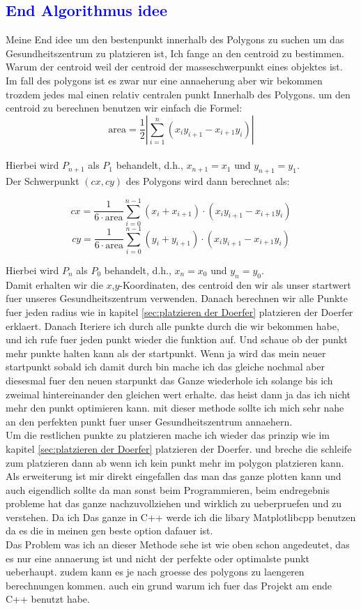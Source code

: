 \documentclass{article}
\begin{document}
\subsection{\textcolor{blue}{End Algorithmus idee}}\label{sec:End}
Meine End idee um den bestenpunkt innerhalb des Polygons zu suchen um das Gesundheitszentrum zu platzieren ist, Ich fange an den centroid zu bestimmen. Warum der centroid weil der centroid der masseschwerpunkt eines objektes ist. Im fall des polygons ist es zwar nur eine annaeherung aber wir bekommen trozdem jedes mal einen relativ centralen punkt Innerhalb des Polygons. um den centroid zu berechnen benutzen wir einfach die Formel:
\[
\text{area} = \frac{1}{2} \left| \sum_{i=1}^{n} (x_i y_{i+1} - x_{i+1} y_i) \right|
\]
\\
Hierbei wird $P_{n+1}$ als $P_1$ behandelt, d.h., $x_{n+1} = x_1$ und $y_{n+1} = y_1$.
\\
Der Schwerpunkt $(cx, cy)$ des Polygons wird dann berechnet als:

\[
cx = \frac{1}{6 \cdot \text{area}} \sum_{i=0}^{n-1} (x_i + x_{i+1}) \cdot (x_i y_{i+1} - x_{i+1} y_i)
\]
\[
cy = \frac{1}{6 \cdot \text{area}} \sum_{i=0}^{n-1} (y_i + y_{i+1}) \cdot (x_i y_{i+1} - x_{i+1} y_i)
\]

Hierbei wird $P_{n}$ als $P_0$ behandelt, d.h., $x_{n} = x_0$ und $y_{n} = y_0$.
\\
Damit erhalten wir die $x$,$y$-Koordinaten, des centroid den wir als unser startwert fuer unseres Gesundheitszentrum verwenden. Danach berechnen wir alle Punkte fuer jeden radius wie in kapitel \ref{sec:platzieren der Doerfer} platzieren der Doerfer erklaert. Danach Iteriere ich durch alle punkte durch die wir bekommen habe, und ich rufe fuer jeden punkt wieder die funktion auf. Und schaue ob der punkt mehr punkte halten kann als der startpunkt. Wenn ja wird das mein neuer startpunkt sobald ich damit durch bin mache ich das gleiche nochmal aber diesesmal fuer den neuen starpunkt das Ganze wiederhole ich solange bis ich zweimal hintereinander den gleichen wert erhalte. das heist dann ja das ich nicht mehr den punkt optimieren kann. mit dieser methode sollte ich mich sehr nahe an den perfekten punkt fuer unser Gesundheitszentrum annaehern.
\\
Um die restlichen punkte zu platzieren mache ich wieder das prinzip wie im kapitel \ref{sec:platzieren der Doerfer} platzieren der Doerfer. und breche die schleife zum platzieren dann ab wenn ich kein punkt mehr im polygon platzieren kann.
\\
Als erweiterung ist mir direkt eingefallen das man das ganze plotten kann und auch eigendlich sollte da man sonst beim Programmieren, beim endregebnis probleme hat das ganze nachzuvollziehen und wirklich zu ueberpruefen und zu verstehen. Da ich Das ganze in C++ werde ich die libary Matplotlibcpp benutzen da es die in meinen gen beste option dafauer ist.
\\
Das Problem was ich an dieser Methode sehe ist wie oben schon angedeutet, das es nur eine annaerung ist und nicht der perfekte oder optimalste punkt ueberhaupt. zudem kann es je nach groesse des polygons zu laengeren berechnungen kommen. auch ein grund warum ich fuer das Projekt am ende C++ benutzt habe.
\end{document}
